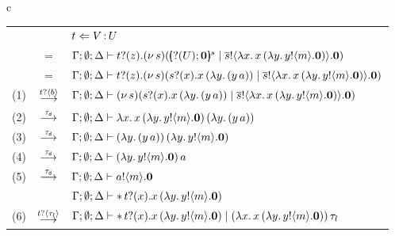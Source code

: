 \begin{example}
\begin{figure}
\begin{tabular}{c}
	\begin{tabular}{rcl}
         &    &   $t \Leftarrow V{\,:\,}U$  \\
		   &  $=$ & $\Gamma; \emptyset; \Delta \vdash t ? (z) . (\nu\, s)([\!\!(? (U) ; \mathbf{0})\!\!]^{s} \;|\; \overline{s} ! \langle \lambda x.\,x\, {(}\lambda y.\,y ! \langle m \rangle . \mathbf{0}) \rangle . \mathbf{0})$\\
		&  $=$& $\Gamma; \emptyset; \Delta \vdash t ? (z) . (\nu\, s)(s ? (x) . x\, {(\lambda y.\,(y\, {a}))} \;|\; \overline{s} ! \langle \lambda x.\,x\, {(}\lambda y.\,y ! \langle m \rangle . \mathbf{0}) \rangle . \mathbf{0})$\\
		(1)   &$\stackrel{t ? \langle b \rangle}{\longrightarrow}$& $\Gamma; \emptyset; \Delta \vdash (\nu\, s)(s ? (x) . x\, {(\lambda y.\,(y\, {a}))} \;|\; \overline{s} ! \langle \lambda x.\,x\, {(}\lambda y.\,y ! \langle m \rangle . \mathbf{0}) \rangle . \mathbf{0})$\\
		(2)  &$\stackrel{\tau_{\mathsf{d}}}{\longrightarrow}$& $\Gamma; \emptyset; \Delta \vdash \lambda x.\,x\, {(}\lambda y.\,y ! \langle m \rangle . \mathbf{0})\, {(\lambda y.\,(y\, {a}))}$\\
		(3)  &$\stackrel{\tau_{\mathsf{d}}}{\longrightarrow}$& $\Gamma; \emptyset; \Delta \vdash (\lambda y.\,(y\, {a}))\, {(\lambda y.\,y ! \langle m \rangle . \mathbf{0})} $\\
		(4)   &$\stackrel{\tau_{\mathsf{d}}}{\longrightarrow}$& $\Gamma; \emptyset; \Delta \vdash (\lambda y.\,y ! \langle m \rangle . \mathbf{0})\, {a}$\\
		(5)   &$\stackrel{\tau_{\mathsf{d}}}{\longrightarrow}$& $\Gamma; \emptyset; \Delta \vdash a ! \langle m \rangle . \mathbf{0}$   \\ \vspace{4mm}
		 & & $\Gamma; \emptyset; \Delta \vdash \ast\,{} t ? (x) . x\, {(}\lambda y.\,y ! \langle m \rangle . \mathbf{0}) $\\
		(6) &$\stackrel{t ? \langle \tau_l \rangle}{\longrightarrow}$& $\Gamma; \emptyset; \Delta \vdash \ast\,{} t ? (x) . x\, {(}\lambda y.\,y ! \langle m \rangle . \mathbf{0}) \;|\; (\lambda x.\,x\, {(}\lambda y.\,y ! \langle m \rangle . \mathbf{0}))\, {\tau_l}$\\

\end{tabular}
\end{tabular}
\end{figure}
\end{example}
